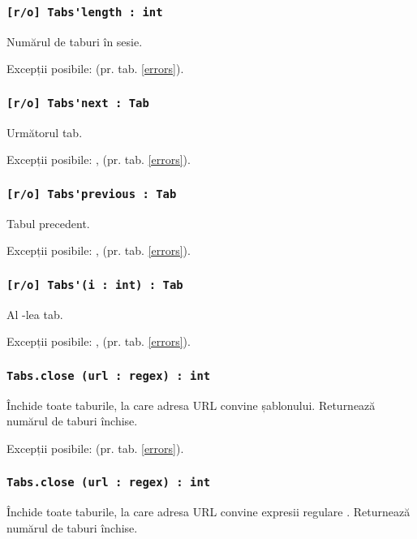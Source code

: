 \subsubsection{\lstinline|[r/o] Tabs'length : int|}

Numărul de taburi în sesie.

Excepții posibile:  (pr. tab. \ref{errors}).

\subsubsection{\lstinline|[r/o] Tabs'next : Tab|}

Următorul tab.

Excepții posibile: ,  (pr. tab. \ref{errors}).

\subsubsection{\lstinline|[r/o] Tabs'previous : Tab|}

Tabul precedent.

Excepții posibile: ,  (pr. tab. \ref{errors}).

\subsubsection{\lstinline|[r/o] Tabs'(i : int) : Tab|}

Al -lea tab.

Excepții posibile: ,  (pr. tab. \ref{errors}).

\subsubsection{\lstinline|Tabs.close (url : regex) : int|}

Închide toate taburile, la care adresa URL convine șablonului. Returnează numărul de taburi închise.

Excepții posibile:  (pr. tab. \ref{errors}).

\subsubsection{\lstinline|Tabs.close (url : regex) : int|}

Închide toate taburile, la care adresa URL convine expresii regulare . Returnează numărul de taburi închise.

